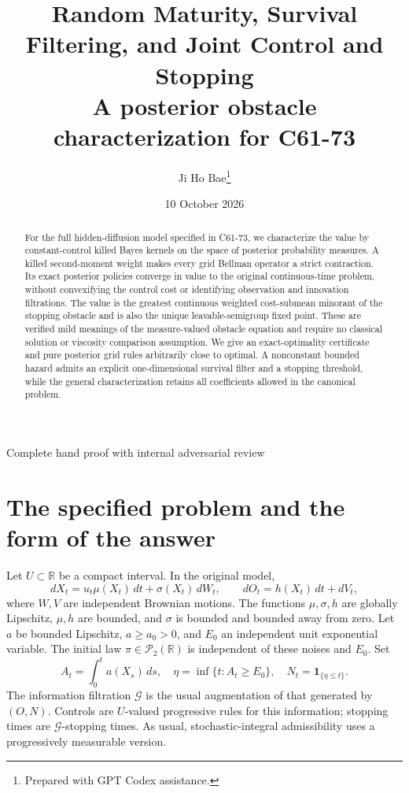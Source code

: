 \documentclass[11pt,a4paper]{article}
\title{Random Maturity, Survival Filtering, and Joint Control and Stopping\\
\large A posterior obstacle characterization for C61-73}
\author{Ji Ho Bae\thanks{Prepared with GPT Codex assistance.}}
\date{10 October 2026}
\theoremstyle{definition}
\theoremstyle{remark}
\newcommand{\R}{\mathbb R}
\newcommand{\Ptwo}{\mathcal P_2(\R)}
\newcommand{\ind}{\mathbf 1}
\begin{document}
\maketitle
\begin{center}\small Complete hand proof with internal adversarial review\end{center}

\begin{abstract}
For the full hidden-diffusion model specified in C61-73, we characterize
the value by constant-control killed Bayes kernels on the space of
posterior probability measures. A killed second-moment weight makes
every grid Bellman operator a strict contraction. Its exact posterior
policies converge in value to the original continuous-time problem,
without convexifying the control cost or identifying observation and
innovation filtrations. The value is the greatest continuous weighted
cost-submean minorant of the stopping obstacle and is also the unique
leavable-semigroup fixed point. These are verified mild meanings of the
measure-valued obstacle equation and require no classical solution or
viscosity comparison assumption. We give an exact-optimality certificate
and pure posterior grid rules arbitrarily close to optimal. A nonconstant
bounded hazard admits an explicit one-dimensional survival filter and
a stopping threshold, while the general characterization retains all
coefficients allowed in the canonical problem.
\end{abstract}

\section{The specified problem and the form of the answer}

Let \(U\subset\R\) be a compact interval. In the original model,
\[
 dX_t=u_t\mu(X_t)\,dt+\sigma(X_t)\,dW_t,\qquad
 dO_t=h(X_t)\,dt+dV_t,
\]
where \(W,V\) are independent Brownian motions. The functions
\(\mu,\sigma,h\) are globally Lipschitz, \(\mu,h\) are bounded, and
\(\sigma\) is bounded and bounded away from zero. Let \(a\) be bounded
Lipschitz, \(a\geq a_0>0\), and \(E_0\) an independent unit exponential
variable. The initial law \(\pi\in\Ptwo\) is independent of these
noises and \(E_0\). Set
\[
 A_t=\int_0^t a(X_s)\,ds,\quad
 \eta=\inf\{t:A_t\geq E_0\},\quad N_t=\ind_{\{\eta\leq t\}}.
\]
The information filtration \(\mathcal G\) is the usual augmentation
of that generated by \((O,N)\). Controls are \(U\)-valued progressive
rules for this information; stopping times are \(\mathcal G\)-stopping
times. As usual, stochastic-integral admissibility uses a progressively
measurable version.
\end{document}
